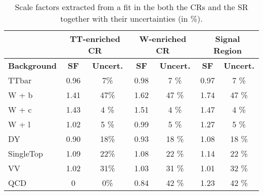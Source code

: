 \documentclass[10pt]{article}
\begin{document}
\begin{table}[!ht]
\begin{center}
\begin{tabular}{|l|c|c||c|c||c|c|}
\hline
\hline
& \multicolumn{2}{c|}{\textbf{TT-enriched CR }} & \multicolumn{2}{c|}{\textbf{W-enriched CR}}  & \multicolumn{2}{c|}{\textbf{Signal Region}} \\
\hline
\hline
\textbf{Background} & \textbf{SF} & \textbf{Uncert.} & \textbf{SF} & \textbf{Uncert.} & \textbf{SF} & \textbf{Uncert.}\\
\hline
TTbar                       & 0.96 & 7\%    & 0.98 & 7  \%  & 0.97 & 7  \% \\
\hline                                                                     
W + b                       & 1.41 & 47\%   & 1.62 & 47 \%  & 1.74 & 47 \% \\
W + c                       & 1.43 & 4 \%   & 1.51 & 4  \%  & 1.47 & 4  \% \\
W + l                       & 1.02 & 5 \%   & 0.99 & 5  \%  & 1.27 & 5  \% \\
\hline                                                                     
DY                          & 0.90 & 18\%   & 0.93 & 18 \%  & 1.08 & 18 \% \\
\hline                                                                     
SingleTop                   & 1.09 & 22\%   & 1.08 & 22 \%  & 1.14 & 22 \% \\
\hline                                                                     
VV                          & 1.02 & 31\%   & 1.03 & 31 \%  & 1.01 & 32 \% \\
\hline                                                                     
QCD                         & 0    & 0\%    & 0.84 & 42 \%  & 1.23 & 42 \% \\
\hline
\hline
\end{tabular}
\caption{Scale factors extracted from a fit in the both the CRs and the SR together with their uncertainties (in \%).}
\label{tab:SFtable}
\end{center}
\end{table} 
\end{document}
